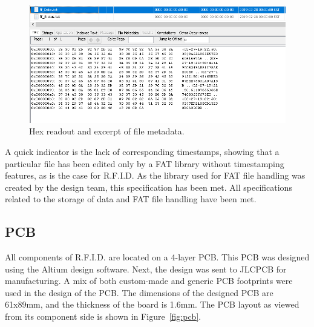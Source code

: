 


\begin{figure}[H]
    \centering
    \includegraphics[width=1\textwidth]{Figures/5_results/SD_notamper.png} 
    \caption{Hex readout and excerpt of file metadata.}
    \label{fig:notamper}
\end{figure}

A quick indicator is the lack of corresponding timestamps, showing that a particular file has been edited only by a FAT library without timestamping features, as is the case for R.F.I.D. As the library used for FAT file handling was created by the design team, this specification has been met. All specifications related to the storage of data and FAT file handling have been met.


\subsection{PCB}

All components of R.F.I.D. are located on a 4-layer PCB. This PCB was designed using the Altium design software. Next, the design was sent to JLCPCB for manufacturing. A mix of both custom-made and generic PCB footprints were used in the design of the PCB. The dimensions of the designed PCB are 61x89mm, and the thickness of the board is 1.6mm. The PCB layout as viewed from its component side is shown in Figure~\ref{fig:pcb}.

